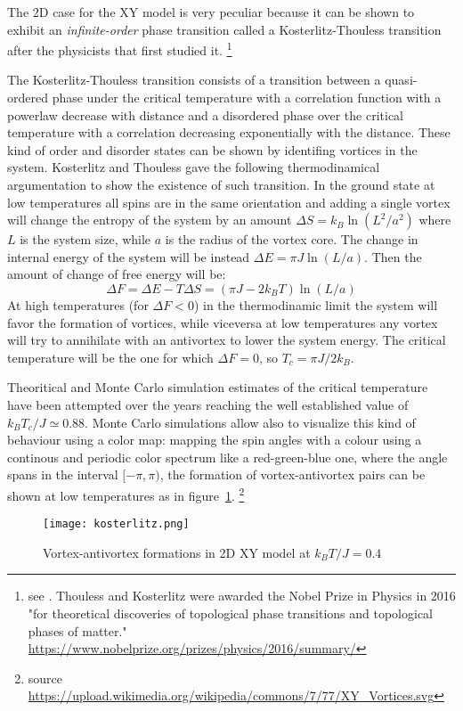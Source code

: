 The 2D case for the XY model is very peculiar because it can be shown to exhibit an
\emph{infinite-order} phase transition called a Kosterlitz-Thouless transition 
after the physicists that first studied it. \footnote{see 
\cite{Kosterlitz_1973}. Thouless and Kosterlitz were awarded the Nobel Prize in 
Physics in 2016 "for theoretical discoveries of topological phase transitions and 
topological phases of matter." 
\url{https://www.nobelprize.org/prizes/physics/2016/summary/}}

The Kosterlitz-Thouless transition consists of a transition between a quasi-ordered 
phase under the critical temperature with a correlation function with a powerlaw
decrease with distance and a disordered phase over the critical temperature with 
a correlation decreasing exponentially with the distance. These kind of order and
disorder states can be shown by identifing vortices in the system. Kosterlitz and 
Thouless gave the following thermodinamical argumentation to show the existence of such
transition. In the ground state at low temperatures all spins are in the same 
orientation and adding a single vortex will change the entropy of the system by
an amount $\Delta S = k_B \ln(L^2 / a^2)$ where $L$ is the system size, while $a$ 
is the radius of the vortex core. The change in internal energy of the system will
be instead $\Delta E = \pi J \ln(L/a)$. Then the amount of change of free energy will be:
$$ \Delta F = \Delta E - T \Delta S = (\pi J - 2 k_B T) \ln(L/a) $$
At high temperatures (for $\Delta F < 0$) in the thermodinamic limit the system 
will favor the formation of vortices, while viceversa at low temperatures
any vortex will try to annihilate with an antivortex to lower the system energy.
The critical temperature will be the one for which $\Delta F = 0$, so $T_c = \pi
J / 2 k_B$.

Theoritical and Monte Carlo simulation estimates of the critical temperature have
been attempted over the years reaching the well established value of $k_B T_c / J
\simeq 0.88$. Monte Carlo simulations allow also to visualize this kind of 
behaviour using a color map: mapping the spin angles with a colour using a 
continous and periodic color spectrum like a red-green-blue one, where the angle
spans in the interval $[-\pi, \pi)$, the formation of vortex-antivortex pairs can 
be shown at low temperatures as in figure~\ref{fig:kosterlitz}.
\footnote{source 
\url{https://upload.wikimedia.org/wikipedia/commons/7/77/XY_Vortices.svg}}

\begin{figure}[h]
\label{fig:kosterlitz}
\centering
\texttt{[image: kosterlitz.png]}
\caption{Vortex-antivortex formations in 2D XY model at $k_B T / J = 0.4$}
\end{figure}
 

